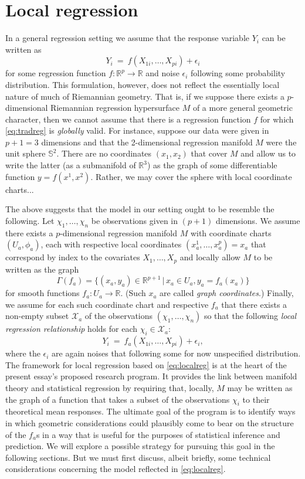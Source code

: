 \documentclass[11pt]{article}
\newcommand{\be}{\begin{equation}}
\newcommand{\ee}{\end{equation}}
\newcommand{\benn}{\begin{equation*}}
\newcommand{\eenn}{\end{equation*}}
\newcommand{\gep}{\epsilon}
\newcommand{\R}{\ensuremath{\mathbb{R}}}
\newcommand{\sph}{\mathbb{S}}
\numberwithin{equation}{section}
\begin{document}
\section{Local regression}

In a general regression setting we assume that the response variable $Y_i$ can be written as
\be\label{eq:tradreg}
	Y_i \ = \ f(X_{1i}, \ldots, X_{pi}) + \gep_i 
\ee
for some regression function $f: \R^p \to \R$ and noise $\gep_i$ following some probability distribution. This formulation, however, does not reflect the essentially local nature of much of Riemannian geometry. That is, if we suppose there exists a $p$-dimensional Riemannian regression hypersurface $M$ of a more general geometric character, then we cannot assume that there is a regression function $f$ for which \eqref{eq:tradreg} is \emph{globally} valid. For instance, suppose our data were given in $p + 1 = 3$ dimensions and that the 2-dimensional regression manifold $M$ were the unit sphere $\sph^2$. There are no coordinates $(x_1, x_2)$ that cover $M$ and allow us to write the latter (as a submanifold of $\R^3$) as the graph of some differentiable function $y = f(x^1, x^2)$. Rather, we may cover the sphere with local coordinate charts...

The above suggests that the model in our setting ought to be resemble the following. Let $\chi_1, \ldots, \chi_n$ be observations given in $(p+1)$ dimensions. We assume there exists a $p$-dimensional regression manifold $M$ with coordinate charts $(U_a, \phi_a)$, each with respective local coordinates $(x_a^1, \ldots, x_a^p) = x_a$ that correspond by index to the covariates $X_1, \ldots, X_p$ and locally allow $M$ to be written as the graph
\benn
\Gamma(f_a ) = \{ (x_a, y_a) \in \R^{p+1} \, | \, x_a \in U_a, y_a = f_a(x_a) \}
\eenn
for smooth functions $f_a: U_a \to \R$. (Such $x_a$ are called \emph{graph coordinates}.) Finally, we assume for each such coordinate chart and respective $f_a$ that there exists a non-empty subset $\mathcal{X}_a$ of the observations $(\chi_1, \ldots, \chi_n)$ so that the following \emph{local regression relationship} holds for each $\chi_i \in \mathcal{X}_a$:
\be\label{eq:localreg}
	Y_i \ = \ f_a(X_{1i}, \ldots, X_{pi}) + \gep_i,
\ee
where the $\gep_i$ are again noises that following some for now unspecified distribution. The framework for local regression based on \eqref{eq:localreg} is at the heart of the present essay's proposed research program. It provides the link between manifold theory and statistical regression by requiring that, locally, $M$ may be written as the graph of a function that takes a subset of the observations $\chi_i$ to their theoretical mean responses. The ultimate goal of the program is to identify ways in which geometric considerations could plausibly come to bear on the structure of the $f_a$s in a way that is useful for the purposes of statistical inference and prediction. We will explore a possible strategy for pursuing this goal in the following sections. But we must first discuss, albeit briefly, some technical considerations concerning the model reflected in \eqref{eq:localreg}.
\end{document}
